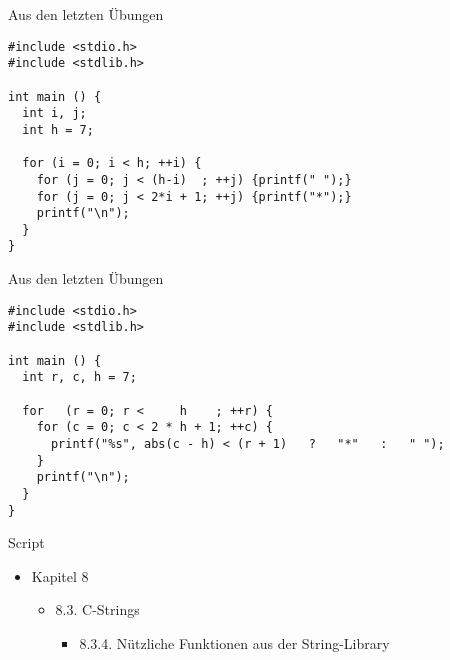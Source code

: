 
\begin{frame}[fragile]{Aus den letzten Übungen}
%
\begin{codebox}
\begin{verbatim}
#include <stdio.h>
#include <stdlib.h>

int main () {
  int i, j;
  int h = 7;
  
  for (i = 0; i < h; ++i) {
    for (j = 0; j < (h-i)  ; ++j) {printf(" ");}
    for (j = 0; j < 2*i + 1; ++j) {printf("*");}
    printf("\n");
  }
}
\end{verbatim}
\end{codebox}
%
\end{frame}


\begin{frame}[fragile]{Aus den letzten Übungen}
%
\begin{codebox}
\begin{verbatim}
#include <stdio.h>
#include <stdlib.h>

int main () {
  int r, c, h = 7;
  
  for   (r = 0; r <     h    ; ++r) {
    for (c = 0; c < 2 * h + 1; ++c) {
      printf("%s", abs(c - h) < (r + 1)   ?   "*"   :   " ");
    }
    printf("\n");
  }
}
\end{verbatim}
\end{codebox}
%
\end{frame}


\begin{frame}{Script}
%
\begin{itemize}
\item Kapitel 8
	\begin{itemize}
	\item 8.3. C-Strings
		\begin{itemize}
		\item 8.3.4. Nützliche Funktionen aus der String-Library
		\end{itemize}
	\end{itemize}
\end{itemize}
%
\end{frame}

